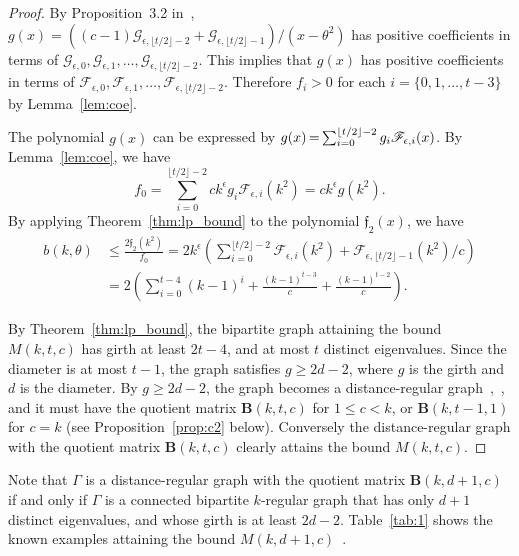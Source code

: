 \documentclass[ALCO,ThmDefs,Unicode,epreuves]{cedram}
\newcommand*{\Mk}{\mkern -2mu}
\begin{document}
\begin{proof}
By Proposition~3.2 in~\cite{CK07}, 
$g(x)=((c-1)\mathscr{G}_{\epsilon,\lfloor t/2 \rfloor-2}+\mathscr{G}_{\epsilon,\lfloor t/2 \rfloor-1})/(x-\theta^2)$ has positive coefficients 
in terms of $\mathscr{G}_{\epsilon,0},\mathscr{G}_{\epsilon,1},\ldots, \mathscr{G}_{\epsilon,\lfloor t/2 \rfloor-2}$. This implies that $g(x)$ has positive 
coefficients in terms of $\mathscr{F}_{\epsilon,0},\mathscr{F}_{\epsilon,1},\ldots, \mathscr{F}_{\epsilon,\lfloor t/2 \rfloor-2}$.
Therefore $f_i>0$ for each $i=\{0,1,\ldots, t-3 \}$ by 
Lemma~\ref{lem:coe}. 

The polynomial $g(x)$ can be expressed by $g(x)\Mk =\Mk \sum_{i=0}^{\lfloor t/2 \rfloor-2}g_i \mathscr{F}_{\epsilon,i}(x)$. 
By Lemma~\ref{lem:coe}, we have
\[
f_0=\sum_{i=0}^{\lfloor t/2 \rfloor-2} c k^{\epsilon} g_i \mathscr{F}_{\epsilon,i}(k^2)=c k^{\epsilon} g(k^2).
\]
By applying Theorem~\ref{thm:lp_bound} to the polynomial $\mathfrak{f}_2(x)$, we have
\begin{align*}
b(k,\theta) &\leq \frac{2\mathfrak{f}_2(k^2)}{f_0}=2k^\epsilon\left( \sum_{i=0}^{\lfloor t/2 \rfloor-2}\mathscr{F}_{\epsilon,i}(k^2)+\mathscr{F}_{\epsilon,\lfloor t/2 \rfloor-1}(k^2)/c \right) \\
&=2\left( \sum_{i=0}^{t-4} (k-1)^{i}+ \frac{(k-1)^{t-3}}{c}+
\frac{(k-1)^{t-2}}{c}
\right).
\end{align*}

By Theorem~\ref{thm:lp_bound}, the bipartite graph attaining the bound $M(k,t,c)$ has girth at least $2t-4$, and at most $t$ distinct eigenvalues. Since the diameter is at most $t-1$, the graph satisfies $g\geq 2d-2$, where $g$ is the girth and $d$ is the diameter. By $g\geq 2d-2$, the graph becomes a distance-regular graph~\cite[Theorem~4.4]{ADF16},~\cite{TY00}, and it must have the quotient matrix $\boldsymbol{B}(k,t,c)$ for $1\leq c < k$, or $\boldsymbol{B}(k,t-1,1)$ for $c=k$ (see Proposition~\ref{prop:c2} below). 
Conversely the distance-regular graph with the quotient matrix $\boldsymbol{B}(k,t,c)$ clearly attains the bound $M(k,t,c)$. 
\end{proof}
Note that $\Gamma$ is a distance-regular graph with the quotient matrix $\boldsymbol{B}(k,d+1,c)$ if and only if $\Gamma$ is a connected bipartite $k$-regular graph that has only $d+1$ distinct eigenvalues, and whose girth is at least $2d-2$. 
Table~\ref{tab:1} shows the known examples attaining the bound $M(k,d+1,c)$~\cite[Section~6.11]{BCN}. 

\end{document}

